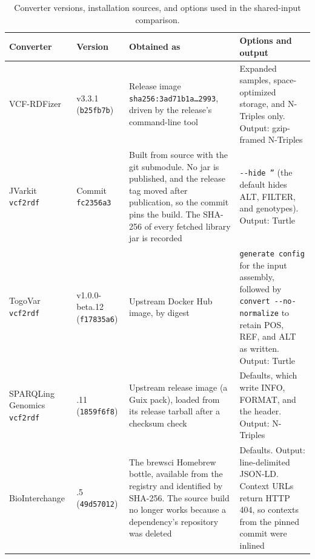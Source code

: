 \documentclass[11pt]{article}
\newcommand{\rowsep}{\noalign{\vskip2pt{\color{black!22}\hrule height 0.4pt}\vskip2pt}}%
\begin{document}
\begin{table}[!htbp]
\caption{Converter versions, installation sources, and options used in the shared-input comparison.}\label{tab:converters-tools}%
\centering\footnotesize\setlength{\tabcolsep}{4pt}\renewcommand{\arraystretch}{1.1}\renewcommand{\tabularxcolumn}[1]{m{#1}}%
\begin{tabularx}{\textwidth}{@{}>{\raggedright\arraybackslash}m{}>{\raggedright\arraybackslash}m{}>{\raggedright\arraybackslash}X>{\raggedright\arraybackslash}m{}@{}}
\toprule
\textbf{Converter} & \textbf{Version} & \textbf{Obtained as} & \textbf{Options and output}\\
\midrule
VCF-RDFizer & v3.3.1 (\texttt{b25fb7b}) & Release image \texttt{sha256:3ad71b1a\ldots2993}, driven by the release's command-line tool & Expanded samples, space-optimized storage, and N-Triples only.
Output: gzip-framed N-Triples\\
\rowsep
JVarkit \texttt{vcf2rdf} \cite{JVarkit_2015} & Commit \texttt{fc2356a3} & Built from source with the git submodule.
No jar is published, and the release tag moved after publication, so the commit pins the build.
The SHA-256 of every fetched library jar is recorded & \texttt{-{}-hide ''} (the default hides ALT, FILTER, and genotypes).
Output: Turtle\\
\rowsep
TogoVar \texttt{vcf2rdf} \cite{togovar_2022} & v1.0.0-beta.12 (\texttt{f17835a6}) & Upstream Docker Hub image, by digest & \texttt{generate config} for the input assembly, followed by \texttt{convert -{}-no-normalize} to retain POS, REF, and ALT as written.
Output: Turtle\\
\rowsep
SPARQLing Genomics \texttt{vcf2rdf} \cite{sparqling_genomics_software} & 0.99.11 (\texttt{1859f6f8}) & Upstream release image (a Guix pack), loaded from its release tarball after a checksum check & Defaults, which write INFO, FORMAT, and the header.
Output: N-Triples\\
\rowsep
BioInterchange \cite{biointerchange2_software} & 2.0.5 (\texttt{49d57012}) & The brewsci Homebrew bottle, available from the registry and identified by SHA-256.
The source build no longer works because a dependency's repository was deleted & Defaults.
Output: line-delimited JSON-LD.
Context URLs return HTTP 404, so contexts from the pinned commit were inlined\\
\bottomrule
\end{tabularx}
\end{table}
\end{document}
